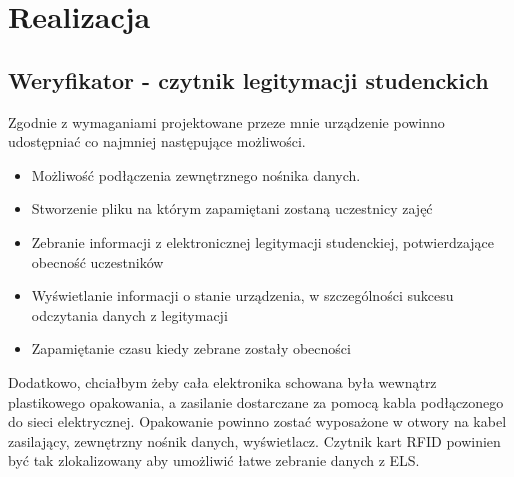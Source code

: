 \documentclass[declaration,shortabstract, mgr]{iithesis}
\begin{document}
\chapter{Realizacja}
\section{Weryfikator - czytnik legitymacji studenckich}
\indent Zgodnie z wymaganiami projektowane przeze mnie urządzenie powinno udostępniać co najmniej następujące możliwości.
\begin{itemize}
\item Możliwość podłączenia zewnętrznego nośnika danych.
\item Stworzenie pliku na którym zapamiętani zostaną uczestnicy zajęć
\item Zebranie informacji z elektronicznej legitymacji studenckiej, potwierdzające obecność uczestników
\item Wyświetlanie informacji o stanie urządzenia, w szczególności sukcesu odczytania danych z legitymacji
\item Zapamiętanie czasu kiedy zebrane zostały obecności
\end{itemize}
\indent Dodatkowo, chciałbym żeby cała elektronika schowana była wewnątrz plastikowego opakowania, a zasilanie dostarczane za pomocą kabla podłączonego do sieci elektrycznej. Opakowanie powinno zostać wyposażone w otwory na kabel zasilający, zewnętrzny nośnik danych, wyświetlacz. Czytnik kart RFID powinien być tak zlokalizowany aby umożliwić łatwe zebranie danych z ELS.
\end{document}
